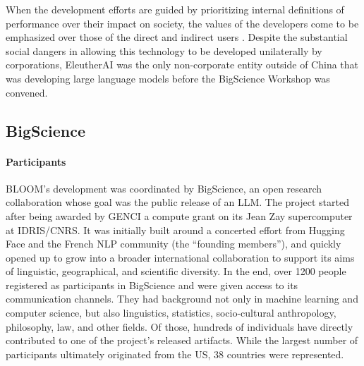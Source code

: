 \documentclass[twoside,11pt]{article}
\begin{document}
When the development efforts are guided by prioritizing internal definitions of performance over their impact on society, the values of the developers come to be emphasized over those of the direct and indirect users \citep{birhane2022values}.
Despite the substantial social dangers in allowing this technology to be developed unilaterally by corporations, EleutherAI \citep{phang2022eleutherai} was the only non-corporate entity outside of China that was developing large language models before the BigScience Workshop was convened.

\subsection{BigScience}\label{sec:organization}

\paragraph{Participants}
BLOOM's development was coordinated by BigScience, an open research collaboration whose goal was the public release of an LLM.
The project started after being awarded by GENCI a compute grant on its Jean Zay supercomputer at IDRIS/CNRS.
It was initially built around a concerted effort from Hugging Face and the French NLP community (the ``founding members''), and quickly opened up to grow into a broader international collaboration to support its aims of linguistic, geographical, and scientific diversity.
In the end, over 1200 people registered as participants in BigScience and were given access to its communication channels.
They had background not only in machine learning and computer science, but also linguistics, statistics, socio-cultural anthropology, philosophy, law, and other fields.
Of those, hundreds of individuals have directly contributed to one of the project’s released artifacts.
While the largest number of participants ultimately originated from the US, 38 countries were represented.
\end{document}
